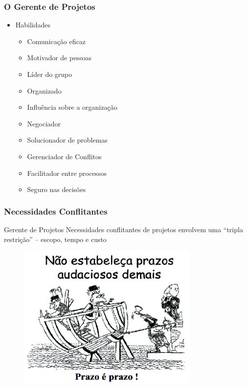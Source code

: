   \begin{frame}
   \frametitle{O Gerente de Projetos}
   \begin{itemize}
    \item Habilidades
    \begin{itemize}
      \item Comunicação eficaz
      
     \item Motivador de pessoas
     \item Líder do grupo
     \item Organizado
     \item Influência sobre a organização
     \item Negociador
     \item Solucionador de problemas
     \item Gerenciador de Conflitos
     \item Facilitador entre processos
     \item Seguro nas decisões
    \end{itemize}
   \end{itemize}
  \end{frame}
 
\begin{frame}
 \frametitle{Necessidades Conflitantes}
 \begin{block}{Gerente de Projetos}
 Necessidades conflitantes de projetos envolvem uma “tripla restrição” – escopo, tempo e custo
 \end{block}
\end{frame}

\begin{frame}
  \begin{figure}
  \centering
  \includegraphics[width = 0.8\textwidth]{figs/fig1_1.png}
 \end{figure}
\end{frame}

